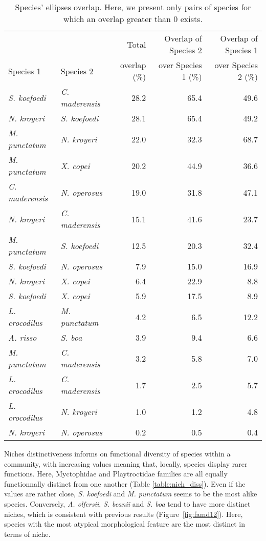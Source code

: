 \begin{table}[!htbp]
\centering
\caption[Overlap of species' ellipses]{Species' ellipses overlap. Here, we present only pairs of species for which an overlap greater than 0 exists.}
\label{table:ell_ovlp}
\begin{tabular}{llrrr}
  \toprule
 &                    & Total        &  Overlap of Species 2 & Overlap of Species 1 \\ 
Species 1 & Species 2 & overlap (\%) &  over Species 1 (\%)  & over Species 2 (\%) \\ 
  \midrule
  \emph{S. koefoedi} & \emph{C. maderensis} & 28.2 & 65.4 & 49.6 \\ 
  \emph{N. kroyeri} & \emph{S. koefoedi} & 28.1 & 65.4 & 49.2 \\ 
  \emph{M. punctatum} & \emph{N. kroyeri} & 22.0 & 32.3 & 68.7 \\ 
  \emph{M. punctatum} & \emph{X. copei} & 20.2 & 44.9 & 36.6 \\ 
  \emph{C. maderensis} & \emph{N. operosus} & 19.0 & 31.8 & 47.1 \\ 
  \emph{N. kroyeri} & \emph{C. maderensis} & 15.1 & 41.6 & 23.7 \\ 
  \emph{M. punctatum} & \emph{S. koefoedi} & 12.5 & 20.3 & 32.4 \\ 
  \emph{S. koefoedi} & \emph{N. operosus} & 7.9 & 15.0 & 16.9 \\ 
  \emph{N. kroyeri} & \emph{X. copei} & 6.4 & 22.9 & 8.8 \\ 
  \emph{S. koefoedi} & \emph{X. copei} & 5.9 & 17.5 & 8.9 \\ 
  \emph{L. crocodilus} & \emph{M. punctatum} & 4.2 & 6.5 & 12.2 \\ 
  \emph{A. risso} & \emph{S. boa} & 3.9 & 9.4 & 6.6 \\ 
  \emph{M. punctatum} & \emph{C. maderensis} & 3.2 & 5.8 & 7.0 \\ 
  \emph{L. crocodilus} & \emph{C. maderensis} & 1.7 & 2.5 & 5.7 \\ 
  \emph{L. crocodilus} & \emph{N. kroyeri} & 1.0 & 1.2 & 4.8 \\ 
  \emph{N. kroyeri} & \emph{N. operosus} & 0.2 & 0.5 & 0.4 \\ 
   \bottomrule
\end{tabular}
\end{table}

Niches distinctiveness informs on functional diversity of species within a community, with increasing values meaning that, locally, species display rarer functions. Here, Myctophidae and Playtroctidae families are all equally functionnally distinct from one another (Table \ref{table:nich_diss}). Even if the values are rather close, \textit{S. koefoedi} and \textit{M. punctatum} seems to be the most alike species. Conversely, \textit{A. olfersii}, \textit{S. beanii} and \textit{S. boa} tend to have more distinct niches, which is consistent with previous results (Figure~\ref{fig:famd12}). Here, species with the most atypical morphological feature are the most distinct in terms of niche. 

